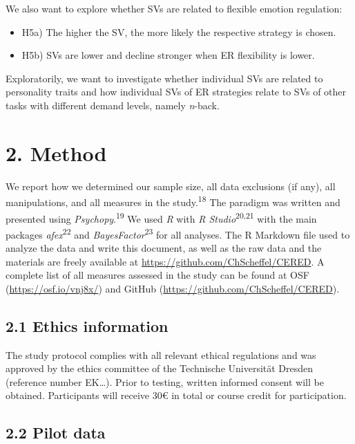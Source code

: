 \documentclass[
  english,
  man,floatsintext]{apa6}
\providecommand{\tightlist}{%
  \setlength{\itemsep}{0pt}\setlength{\parskip}{0pt}}
\begin{document}
We also want to explore whether SVs are related to flexible emotion regulation:

\begin{itemize}
\tightlist
\item
  H5a) The higher the SV, the more likely the respective strategy is chosen.
\item
  H5b) SVs are lower and decline stronger when ER flexibility is lower.
\end{itemize}

Exploratorily, we want to investigate whether individual SVs are related to personality traits and how individual SVs of ER strategies relate to SVs of other tasks with different demand levels, namely \emph{n}-back.

\hypertarget{method}{%
\section{2. Method}\label{method}}

We report how we determined our sample size, all data exclusions (if any), all manipulations, and all measures in the study.\textsuperscript{18}
The paradigm was written and presented using \emph{Psychopy}.\textsuperscript{19}
We used \emph{R} with \emph{R Studio}\textsuperscript{20,21} with the main packages \emph{afex}\textsuperscript{22} and \emph{BayesFactor}\textsuperscript{23} for all analyses.
The R Markdown file used to analyze the data and write this document, as well as the raw data and the materials are freely available at \url{https://github.com/ChScheffel/CERED}.
A complete list of all measures assessed in the study can be found at OSF (\url{https://osf.io/vnj8x/}) and GitHub (\url{https://github.com/ChScheffel/CERED}).

\hypertarget{ethics-information}{%
\subsection{2.1 Ethics information}\label{ethics-information}}

The study protocol complies with all relevant ethical regulations and was approved by the ethics committee of the Technische Universität Dresden (reference number EK\ldots).
Prior to testing, written informed consent will be obtained.
Participants will receive 30€ in total or course credit for participation.

\hypertarget{pilot-data}{%
\subsection{2.2 Pilot data}\label{pilot-data}}
\end{document}
